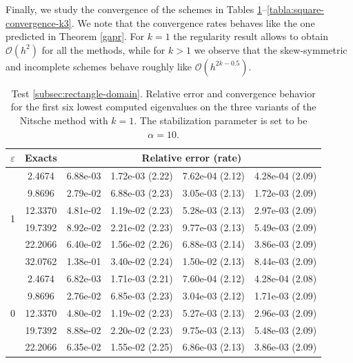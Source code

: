 \documentclass[onefignum,onetabnum,final]{siamart250211}
\numberwithin{equation}{section}
\newcommand\0{\boldsymbol{0}}
\begin{document}
	Finally, we study the convergence of the schemes in Tables \ref{tabla:square-convergence-k1}--\ref{tabla:square-convergence-k3}. We note that the convergence rates behaves like the one predicted in Theorem \ref{gapr}. For $k=1$ the regularity result allows to obtain $\mathcal{O}(h^2)$ for all the methods, while for $k>1$ we observe that the skew-symmetric and incomplete schemes behave roughly like $\mathcal{O}(h^{2k-0.5})$. 
	
	
	\begin{table}[!hbt]
		\centering
		{\setlength{\tabcolsep}{3.8pt}\footnotesize
			\caption{Test \ref{subsec:rectangle-domain}. Relative error and convergence behavior for the first six lowest computed eigenvalues on the three variants of the Nitsche method with $k=1$. The stabilization parameter is set to be $\alpha=10$.}
			\label{tabla:square-convergence-k1}
			\begin{tabular}{|c|c|cccc|}
				\hline
				$\varepsilon$& Exacts & \multicolumn{4}{c|}{Relative error (rate)} \\
				\hline
				\multirow{6}{0.02\linewidth}{1}&    2.4674 &   6.88e-03  &   1.72e-03 (2.22) &   7.62e-04 (2.12) &   4.28e-04 (2.09)   \\
				&    9.8696 &   2.79e-02  &   6.88e-03 (2.23) &   3.05e-03 (2.13) &   1.72e-03 (2.09)   \\
				&   12.3370 &   4.81e-02  &   1.19e-02 (2.23) &   5.28e-03 (2.13) &   2.97e-03 (2.09)   \\
				&   19.7392 &   8.92e-02  &   2.21e-02 (2.23) &   9.77e-03 (2.13) &   5.49e-03 (2.09)   \\
				&   22.2066 &   6.40e-02  &   1.56e-02 (2.26) &   6.88e-03 (2.14) &   3.86e-03 (2.09)   \\
				&   32.0762 &   1.38e-01  &   3.40e-02 (2.24) &   1.50e-02 (2.13) &   8.44e-03 (2.09)   \\
				\hline
				\multirow{6}{0.02\linewidth}{0}&    2.4674 &   6.82e-03  &   1.71e-03 (2.21) &   7.60e-04 (2.12) &   4.28e-04 (2.08)   \\
				&    9.8696 &   2.76e-02  &   6.85e-03 (2.23) &   3.04e-03 (2.12) &   1.71e-03 (2.09)   \\
				&   12.3370 &   4.80e-02  &   1.19e-02 (2.23) &   5.27e-03 (2.13) &   2.96e-03 (2.09)   \\
				&   19.7392 &   8.88e-02  &   2.20e-02 (2.23) &   9.75e-03 (2.13) &   5.48e-03 (2.09)   \\
				&   22.2066 &   6.35e-02  &   1.55e-02 (2.25) &   6.86e-03 (2.13) &   3.86e-03 (2.09)   \\

\end{tabular}}
\end{table}
\end{document}
